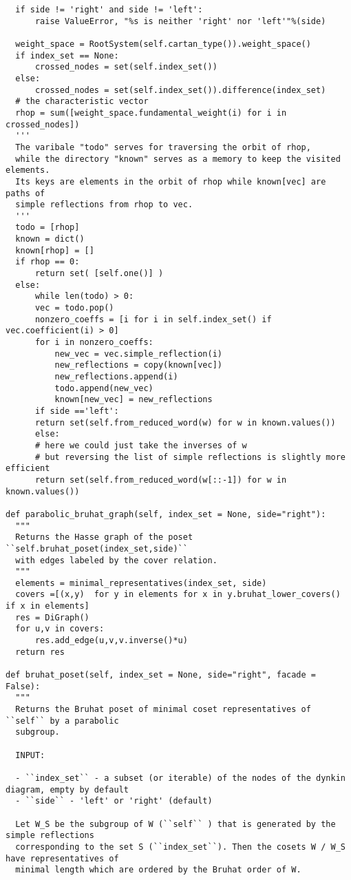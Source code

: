 \begin{appendices}
\begin{verbatim}
  if side != 'right' and side != 'left':
      raise ValueError, "%s is neither 'right' nor 'left'"%(side)
  
  weight_space = RootSystem(self.cartan_type()).weight_space()
  if index_set == None:
      crossed_nodes = set(self.index_set())
  else:
      crossed_nodes = set(self.index_set()).difference(index_set)
  # the characteristic vector
  rhop = sum([weight_space.fundamental_weight(i) for i in  crossed_nodes]) 
  '''
  The varibale "todo" serves for traversing the orbit of rhop, 
  while the directory "known" serves as a memory to keep the visited elements.
  Its keys are elements in the orbit of rhop while known[vec] are paths of 
  simple reflections from rhop to vec.
  '''
  todo = [rhop]
  known = dict()
  known[rhop] = []
  if rhop == 0:
      return set( [self.one()] )
  else:
      while len(todo) > 0:
	  vec = todo.pop()
	  nonzero_coeffs = [i for i in self.index_set() if vec.coefficient(i) > 0]
	  for i in nonzero_coeffs:
	      new_vec = vec.simple_reflection(i)
	      new_reflections = copy(known[vec])
	      new_reflections.append(i)
	      todo.append(new_vec)
	      known[new_vec] = new_reflections
      if side =='left':
	  return set(self.from_reduced_word(w) for w in known.values())
      else:
	  # here we could just take the inverses of w 
	  # but reversing the list of simple reflections is slightly more efficient
	  return set(self.from_reduced_word(w[::-1]) for w in known.values()) 
	  
def parabolic_bruhat_graph(self, index_set = None, side="right"):
  """
  Returns the Hasse graph of the poset ``self.bruhat_poset(index_set,side)``
  with edges labeled by the cover relation.
  """
  elements = minimal_representatives(index_set, side)
  covers =[(x,y)  for y in elements for x in y.bruhat_lower_covers() if x in elements]
  res = DiGraph()
  for u,v in covers:
      res.add_edge(u,v,v.inverse()*u)
  return res         
  
def bruhat_poset(self, index_set = None, side="right", facade = False):
  """
  Returns the Bruhat poset of minimal coset representatives of ``self`` by a parabolic 
  subgroup.
  
  INPUT:
  
  - ``index_set`` - a subset (or iterable) of the nodes of the dynkin diagram, empty by default
  - ``side`` - 'left' or 'right' (default)
  
  Let W_S be the subgroup of W (``self`` ) that is generated by the simple reflections 
  corresponding to the set S (``index_set``). Then the cosets W / W_S have representatives of 
  minimal length which are ordered by the Bruhat order of W. 
  

\end{verbatim}
\end{appendices}
